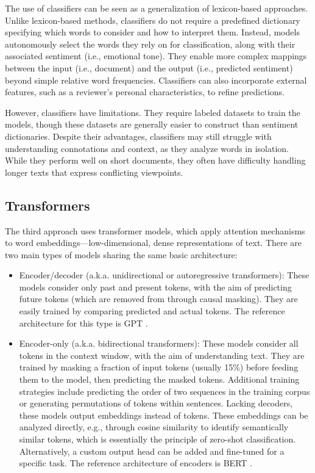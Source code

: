 \documentclass{article}
\begin{document}
The use of classifiers can be seen as a generalization of lexicon-based approaches. Unlike lexicon-based methods, classifiers do not require a predefined dictionary specifying which words to consider and how to interpret them. Instead, models autonomously select the words they rely on for classification, along with their associated sentiment (i.e., emotional tone). They enable more complex mappings between the input (i.e., document) and the output (i.e., predicted sentiment) beyond simple relative word frequencies. Classifiers can also incorporate external features, such as a reviewer’s personal characteristics, to refine predictions.

However, classifiers have limitations. They require labeled datasets to train the models, though these datasets are generally easier to construct than sentiment dictionaries. Despite their advantages, classifiers may still struggle with understanding connotations and context, as they analyze words in isolation. While they perform well on short documents, they often have difficulty handling longer texts that express conflicting viewpoints.

\subsection{Transformers}

The third approach uses transformer models, which apply attention mechanisms to word embeddings—low-dimensional, dense representations of text. There are two main types of models sharing the same basic architecture:
\begin{itemize}
    \item Encoder/decoder (a.k.a. unidirectional or autoregressive transformers): These models consider only past and present tokens, with the aim of predicting future tokens (which are removed from through causal masking). They are easily trained by comparing predicted and actual tokens. The reference architecture for this type is GPT \citep{radford_improving_2018,radford_language_2019}.
    \item Encoder-only (a.k.a. bidirectional transformers): These models consider all tokens in the context window, with the aim of understanding text. They are trained by masking a fraction of input tokens (usually 15\%) before feeding them to the model, then predicting the masked tokens. Additional training strategies include predicting the order of two sequences in the training corpus or generating permutations of tokens within sentences. Lacking decoders, these models output embeddings instead of tokens. These embeddings can be analyzed directly, e.g., through cosine similarity to identify semantically similar tokens, which is essentially the principle of zero-shot classification. Alternatively, a custom output head can be added and fine-tuned for a specific task. The reference architecture of encoders is BERT \citep{devlin_bert_2019}.
\end{itemize}
\end{document}
